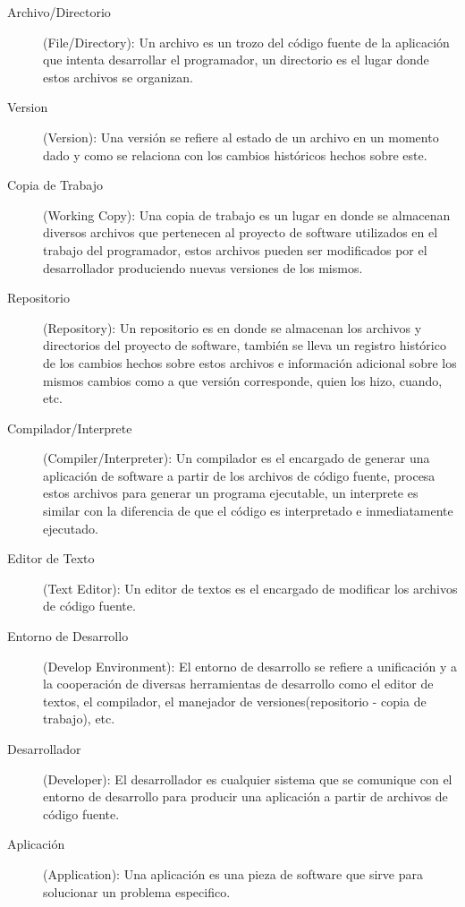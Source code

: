 \begin{description}
	
	\item [Archivo/Directorio](File/Directory): \newline
	Un archivo es un trozo del código fuente de la aplicación que intenta desarrollar el programador, un directorio es el lugar donde estos archivos se organizan.
	
	\item [Version](Version): \newline
	Una versión se refiere al estado de un archivo en un momento dado y como se relaciona con los cambios históricos hechos sobre este.
	
	\item [Copia de Trabajo](Working Copy): \newline
	Una copia de trabajo es un lugar en donde se almacenan diversos archivos que pertenecen al proyecto de software utilizados en el trabajo del programador, estos archivos pueden ser modificados por el desarrollador produciendo nuevas versiones de los mismos.
	
	\item [Repositorio](Repository): \newline
	Un repositorio es en donde se almacenan los archivos y directorios del proyecto de software, también se lleva un registro histórico de los cambios hechos sobre estos archivos e información adicional sobre los mismos cambios como a que versión corresponde, quien los hizo, cuando, etc.
	
	\item [Compilador/Interprete](Compiler/Interpreter): \newline
	Un compilador es el encargado de generar una aplicación de software a partir de los archivos de código fuente, procesa estos archivos para generar un programa ejecutable, un interprete es similar con la diferencia de que el código es interpretado e inmediatamente ejecutado.
	
	\item [Editor de Texto](Text Editor): \newline
	Un editor de textos es el encargado de modificar los archivos de código fuente.
	
	\item [Entorno de Desarrollo](Develop Environment): \newline
	El entorno de desarrollo se refiere a unificación y a la cooperación de diversas herramientas de desarrollo como el editor de textos, el compilador, el manejador de versiones(repositorio - copia de trabajo), etc.
	
	\item [Desarrollador](Developer): \newline
	El desarrollador es cualquier sistema que se comunique con el entorno de desarrollo para producir una aplicación a partir de archivos de código fuente.
	
	\item [Aplicación](Application): \newline
	Una aplicación es una pieza de software que sirve para solucionar un problema especifico.
	
\end{description}


